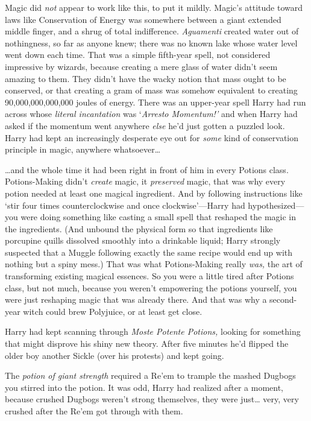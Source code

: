 Magic did \emph{not} appear to work like this, to put it mildly. Magic's 
attitude toward laws like Conservation of Energy was somewhere between a giant 
extended middle finger, and a shrug of total indifference. \emph{Aguamenti} 
created water out of nothingness, so far as anyone knew; there was no known 
lake whose water level went down each time. That was a simple fifth-year spell, 
not considered impressive by wizards, because creating a mere glass of water 
didn't seem amazing to them. They didn't have the wacky notion that mass ought 
to be conserved, or that creating a gram of mass was somehow equivalent to 
creating 90,000,000,000,000 joules of energy. There was an upper-year spell 
Harry had run across whose \emph{literal incantation} was `\emph{Arresto 
Momentum!'} and when Harry had asked if the momentum went anywhere \emph{else} 
he'd just gotten a puzzled look. Harry had kept an increasingly desperate eye 
out for \emph{some} kind of conservation principle in magic, anywhere 
whatsoever{\ldots}

{\ldots}and the whole time it had been right in front of him in every Potions 
class. Potions-Making didn't \emph{create} magic, it \emph{preserved} magic, 
that was why every potion needed at least one magical ingredient. And by 
following instructions like `stir four times counterclockwise and once 
clockwise'---Harry had hypothesized---you were doing something like casting a 
small spell that reshaped the magic in the ingredients. (And unbound the 
physical form so that ingredients like porcupine quills dissolved smoothly into 
a drinkable liquid; Harry strongly suspected that a Muggle following exactly 
the same recipe would end up with nothing but a spiny mess.) That was what 
Potions-Making really \emph{was,} the art of transforming existing magical 
essences. So you were a little tired after Potions class, but not much, because 
you weren't empowering the potions yourself, you were just reshaping magic that 
was already there. And that was why a second-year witch could brew Polyjuice, 
or at least get close.

Harry had kept scanning through \emph{Moste Potente Potions,} looking for 
something that might disprove his shiny new theory. After five minutes he'd 
flipped the older boy another Sickle (over his protests) and kept going.

The \emph{potion of giant strength} required a Re'em to trample the mashed 
Dugbogs you stirred into the potion. It was odd, Harry had realized after a 
moment, because crushed Dugbogs weren't strong themselves, they were 
just{\ldots} very, very crushed after the Re'em got through with them.

